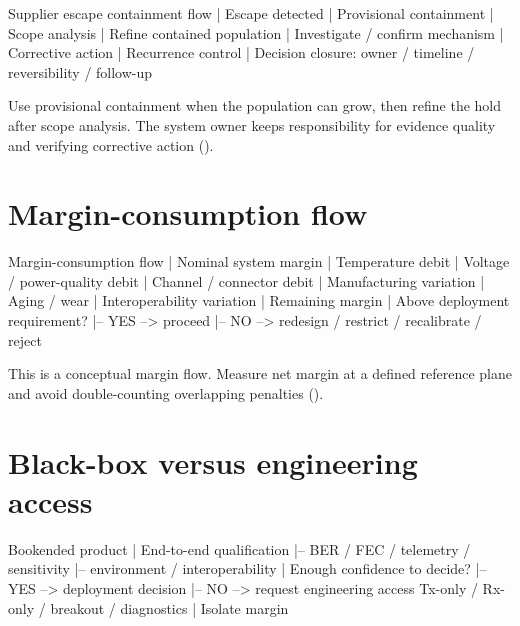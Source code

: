 \begin{dectree}
Supplier escape containment flow
  |
Escape detected
  |
Provisional containment
  |
Scope analysis
  |
Refine contained population
  |
Investigate / confirm mechanism
  |
Corrective action
  |
Recurrence control
  |
Decision closure: owner / timeline / reversibility / follow-up
\end{dectree}


Use provisional containment when the population can grow, then refine the hold
after scope analysis. The system owner keeps responsibility for evidence quality
and verifying corrective action
().

\section{Margin-consumption flow}
\label{sec:tree-margin-budget}

\begin{dectree}
Margin-consumption flow
  |
Nominal system margin
  |
Temperature debit
  |
Voltage / power-quality debit
  |
Channel / connector debit
  |
Manufacturing variation
  |
Aging / wear
  |
Interoperability variation
  |
Remaining margin
  |
Above deployment requirement?
  |-- YES --> proceed
  |-- NO  --> redesign / restrict / recalibrate / reject
\end{dectree}

This is a conceptual margin flow. Measure net margin at a defined reference
plane and avoid double-counting overlapping penalties
().

\section{Black-box versus engineering access}
\label{sec:tree-blackbox-access}

\begin{dectree}
Bookended product
  |
End-to-end qualification
  |-- BER / FEC / telemetry / sensitivity
  |-- environment / interoperability
  |
Enough confidence to decide?
  |-- YES --> deployment decision
  |-- NO  --> request engineering access
              Tx-only / Rx-only / breakout / diagnostics
              |
              Isolate margin
\end{dectree}

